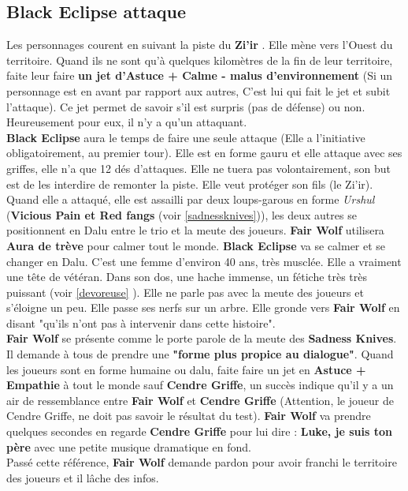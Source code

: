 \documentclass[oneside,12pt]{book}
\newcommand{\BlackEclipse}{\textbf{Black Eclipse} }
\newcommand{\Thomas}{\textbf{Zi'ir} }
\begin{document}
\begin{flushleft}
\section{\BlackEclipse attaque}
\label{black_eclipse}
Les personnages courent en suivant la piste du \Thomas. Elle mène vers l'Ouest du territoire. Quand ils ne sont qu'à quelques kilomètres de la fin de leur territoire, faite leur faire \textbf{un jet d'Astuce + Calme - malus d'environnement} (Si un personnage est en avant par rapport aux autres, C'est lui qui fait le jet et subit l'attaque). Ce jet permet de savoir s'il est surpris (pas de défense) ou non. Heureusement pour eux, il n'y a qu'un attaquant. \\
\BlackEclipse aura le temps de faire une seule attaque (Elle a l'initiative obligatoirement, au premier tour). Elle est en forme gauru et elle attaque avec ses griffes, elle n'a que 12 dés d'attaques. Elle ne tuera pas volontairement, son but est de les interdire de remonter la piste. Elle veut protéger son fils (le Zi'ir).\\
Quand elle a attaqué, elle est assailli par deux loups-garous en forme \textit{Urshul} (\textbf{Vicious Pain et Red fangs} (voir \ref{sadnessknives})), les deux autres se positionnent en Dalu entre le trio et la meute des joueurs. \textbf{Fair Wolf} utilisera \textbf{Aura de trève} pour calmer tout le monde.
\BlackEclipse va se calmer et se changer en Dalu. C'est une femme d'environ 40 ans, très musclée. Elle a vraiment une tête de vétéran. Dans son dos, une hache immense, un fétiche très très puissant (voir \ref{devoreuse} ). Elle ne parle pas avec la meute des joueurs et s'éloigne un peu. Elle passe ses nerfs sur un arbre. Elle gronde vers \textbf{Fair Wolf} en disant "qu'ils n'ont pas à intervenir dans cette histoire". \\ 
\textbf{Fair Wolf} se présente comme le porte parole de la meute des \textbf{Sadness Knives}. Il demande à tous de prendre une \textbf{"forme plus propice au dialogue"}. Quand les joueurs sont en forme humaine ou dalu, faite faire un jet en \textbf{Astuce + Empathie} à tout le monde sauf \textbf{Cendre Griffe}, un succès indique qu'il y a un air de ressemblance entre \textbf{Fair Wolf} et \textbf{Cendre Griffe} (Attention, le joueur de Cendre Griffe, ne doit pas savoir le résultat du test). \textbf{Fair Wolf} va prendre quelques secondes en regarde \textbf{Cendre Griffe} pour lui dire :  {\Large \textbf{Luke, je suis ton père}} avec une petite musique dramatique en fond. \\
Passé cette référence, \textbf{Fair Wolf} demande pardon pour avoir franchi le territoire des joueurs et il lâche des infos. \\

\end{flushleft}
\end{document}

